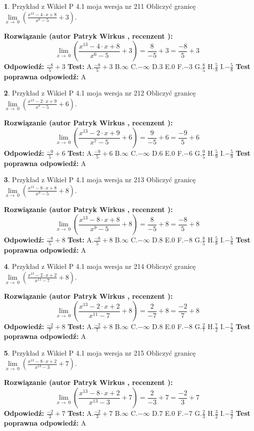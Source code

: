 \documentclass[12pt, a4paper]{article}
\theoremstyle{definition} %
\newtheorem{zad}{}
\newcommand{\zadStart}[1]{\begin{zad}#1\newline}
\newcommand{\zadStop}{\end{zad}}
\newcommand{\rozwStart}[2]{\noindent \textbf{Rozwiązanie (autor #1 , recenzent #2): }\newline}
\newcommand{\rozwStop}{\newline}
\newcommand{\odpStart}{\noindent \textbf{Odpowiedź:}\newline}
\newcommand{\odpStop}{\newline}
\newcommand{\testStart}{\noindent \textbf{Test:}\newline}
\newcommand{\testStop}{\newline}
\newcommand{\kluczStart}{\noindent \textbf{Test poprawna odpowiedź:}\newline}
\newcommand{\kluczStop}{\newline}
\begin{document}
\zadStart{Przykład z Wikieł P 4.1 moja wersja nr 211}
Obliczyć granicę $\lim\limits_{x\to\ 0}(\frac{x^{13}-4 \cdot x +8}{x^{6}-5}+3)$.
\zadStop
\rozwStart{Patryk Wirkus}{}
$$\lim\limits_{x\to\ 0}(\frac{x^{13}-4 \cdot x +8}{x^{6}-5}+3)=\frac{8}{-5}+3=\frac{-8}{5}+3$$
\rozwStop
\odpStart
$\frac{-8}{5}+3$
\odpStop
\testStart
A.$\frac{-8}{5}+3$
B.$\infty$
C.$-\infty$
D.$3$
E.$0$
F.$-3$
G.$\frac{8}{5}$
H.$\frac{5}{8}$
I.$-\frac{5}{8}$
\testStop
\kluczStart
A
\kluczStop



\zadStart{Przykład z Wikieł P 4.1 moja wersja nr 212}
Obliczyć granicę $\lim\limits_{x\to\ 0}(\frac{x^{13}-2 \cdot x +9}{x^{7}-5}+6)$.
\zadStop
\rozwStart{Patryk Wirkus}{}
$$\lim\limits_{x\to\ 0}(\frac{x^{13}-2 \cdot x +9}{x^{7}-5}+6)=\frac{9}{-5}+6=\frac{-9}{5}+6$$
\rozwStop
\odpStart
$\frac{-9}{5}+6$
\odpStop
\testStart
A.$\frac{-9}{5}+6$
B.$\infty$
C.$-\infty$
D.$6$
E.$0$
F.$-6$
G.$\frac{9}{5}$
H.$\frac{5}{9}$
I.$-\frac{5}{9}$
\testStop
\kluczStart
A
\kluczStop



\zadStart{Przykład z Wikieł P 4.1 moja wersja nr 213}
Obliczyć granicę $\lim\limits_{x\to\ 0}(\frac{x^{13}-8 \cdot x +8}{x^{9}-5}+8)$.
\zadStop
\rozwStart{Patryk Wirkus}{}
$$\lim\limits_{x\to\ 0}(\frac{x^{13}-8 \cdot x +8}{x^{9}-5}+8)=\frac{8}{-5}+8=\frac{-8}{5}+8$$
\rozwStop
\odpStart
$\frac{-8}{5}+8$
\odpStop
\testStart
A.$\frac{-8}{5}+8$
B.$\infty$
C.$-\infty$
D.$8$
E.$0$
F.$-8$
G.$\frac{8}{5}$
H.$\frac{5}{8}$
I.$-\frac{5}{8}$
\testStop
\kluczStart
A
\kluczStop



\zadStart{Przykład z Wikieł P 4.1 moja wersja nr 214}
Obliczyć granicę $\lim\limits_{x\to\ 0}(\frac{x^{13}-2 \cdot x +2}{x^{11}-7}+8)$.
\zadStop
\rozwStart{Patryk Wirkus}{}
$$\lim\limits_{x\to\ 0}(\frac{x^{13}-2 \cdot x +2}{x^{11}-7}+8)=\frac{2}{-7}+8=\frac{-2}{7}+8$$
\rozwStop
\odpStart
$\frac{-2}{7}+8$
\odpStop
\testStart
A.$\frac{-2}{7}+8$
B.$\infty$
C.$-\infty$
D.$8$
E.$0$
F.$-8$
G.$\frac{2}{7}$
H.$\frac{7}{2}$
I.$-\frac{7}{2}$
\testStop
\kluczStart
A
\kluczStop



\zadStart{Przykład z Wikieł P 4.1 moja wersja nr 215}
Obliczyć granicę $\lim\limits_{x\to\ 0}(\frac{x^{13}-8 \cdot x +2}{x^{13}-3}+7)$.
\zadStop
\rozwStart{Patryk Wirkus}{}
$$\lim\limits_{x\to\ 0}(\frac{x^{13}-8 \cdot x +2}{x^{13}-3}+7)=\frac{2}{-3}+7=\frac{-2}{3}+7$$
\rozwStop
\odpStart
$\frac{-2}{3}+7$
\odpStop
\testStart
A.$\frac{-2}{3}+7$
B.$\infty$
C.$-\infty$
D.$7$
E.$0$
F.$-7$
G.$\frac{2}{3}$
H.$\frac{3}{2}$
I.$-\frac{3}{2}$
\testStop
\kluczStart
A
\kluczStop
\end{document}
